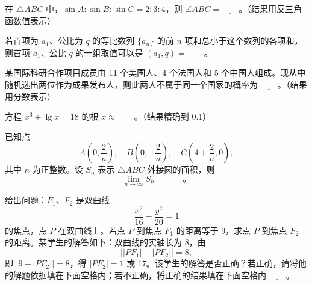 \begin{question}
在 \(\triangle ABC\) 中，\(\sin A:\sin B:\sin C=2:3:4\)，则 \(\angle ABC=\underline{\qquad}\)。（结果用反三角函数值表示）

\end{question}
\begin{question}
若首项为 \(a_1\)、公比为 \(q\) 的等比数列 \(\{a_n\}\) 的前 \(n\) 项和总小于这个数列的各项和，则首项 \(a_1\)、公比 \(q\) 的一组取值可以是 \((a_1,q)=\underline{\qquad}\)。

\end{question}
\begin{question}
某国际科研合作项目成员由 11 个美国人、4 个法国人和 5 个中国人组成。现从中随机选出两位作为成果发布人，则此两人不属于同一个国家的概率为 \(\underline{\qquad}\)。（结果用分数表示）

\end{question}
\begin{question}
方程 \(x^3+\lg x=18\) 的根 \(x\approx\underline{\qquad}\)。（结果精确到 0.1）

\end{question}
\begin{question}
已知点
\nopagebreak[4]
\[
    A\left(0,\frac{2}{n}\right),\quad B\left(0,-\frac{2}{n}\right),\quad C\left(4+\frac{2}{n},0\right),
\]
    其中 \(n\) 为正整数。设 \(S_n\) 表示 \(\triangle ABC\) 外接圆的面积，则
\nopagebreak[4]
\[
    \lim_{n\to\infty}S_n=\underline{\qquad}\mbox{。}
\]

\end{question}
\begin{question}
给出问题：\(F_1\text{、}F_2\) 是双曲线
\nopagebreak[4]
\[
    \frac{x^2}{16}-\frac{y^2}{20}=1
\]
    的焦点，点 \(P\) 在双曲线上。若点 \(P\) 到焦点 \(F_1\) 的距离等于 9，求点 \(P\) 到焦点 \(F_2\) 的距离。某学生的解答如下：双曲线的实轴长为 8，由
\nopagebreak[4]
\[
    \bigl||PF_1|-|PF_2|\bigr|=8,
\]
    即 \(|9-|PF_2||=8\)，得 \(|PF_2|=1\) 或 17。该学生的解答是否正确？若正确，请将他的解题依据填在下面空格内；若不正确，将正确的结果填在下面空格内 \(\underline{\qquad}\)。

\end{question}

